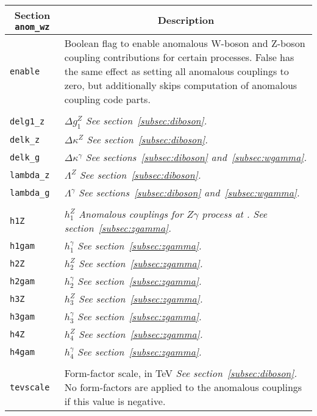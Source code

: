 	\begin{longtable}{p{1.5cm}p{12cm}}
		\toprule
		\multicolumn{1}{c}{{\textbf{Section} \texttt{anom\_wz}}} & \multicolumn{1}{c}{{\textbf{Description}}} \\ 
		\midrule
		{\tt enable} &  Boolean flag to enable anomalous W-boson and Z-boson coupling contributions for certain 
		processes. 	False has the same effect as setting all anomalous couplings to zero, but additionally skips 
		computation of anomalous coupling code parts. \\
		 & \\
		{\tt delg1\_z} & $\Delta g_1^Z$ {\it See section~\ref{subsec:diboson}.} \\
		{\tt delk\_z} & $\Delta\kappa^Z$ {\it See section~\ref{subsec:diboson}.} \\
		{\tt delk\_g} & $\Delta\kappa^\gamma$ {\it See sections~\ref{subsec:diboson} and~\ref{subsec:wgamma}.} \\
		{\tt lambda\_z} & $\Lambda^Z$ {\it See section~\ref{subsec:diboson}.} \\
		{\tt lambda\_g} & $\Lambda^\gamma$ {\it See sections~\ref{subsec:diboson} and~\ref{subsec:wgamma}.} \\
		 & \\
		{\tt h1Z} & $h_1^Z$ {\it Anomalous couplings for $Z\gamma$ process at \NNLO{}. See 
		section~\ref{subsec:zgamma}.} \\
		{\tt h1gam} & $h_1^\gamma$ {\it See section~\ref{subsec:zgamma}.} \\
		{\tt h2Z} & $h_2^Z$ {\it See section~\ref{subsec:zgamma}.} \\
		{\tt h2gam} & $h_2^\gamma$ {\it See section~\ref{subsec:zgamma}.} \\
		{\tt h3Z} & $h_3^Z$ {\it See section~\ref{subsec:zgamma}.} \\
		{\tt h3gam} & $h_3^\gamma$ {\it See section~\ref{subsec:zgamma}.} \\
		{\tt h4Z} & $h_4^Z$ {\it See section~\ref{subsec:zgamma}.} \\
		{\tt h4gam} & $h_4^\gamma$ {\it See section~\ref{subsec:zgamma}.} \\
		 & \\
		{\tt tevscale} & Form-factor scale, in TeV {\it See section~\ref{subsec:diboson}.} 
		No form-factors are applied to the anomalous couplings if this value is negative. \\
		\bottomrule
	\end{longtable}

\clearpage
